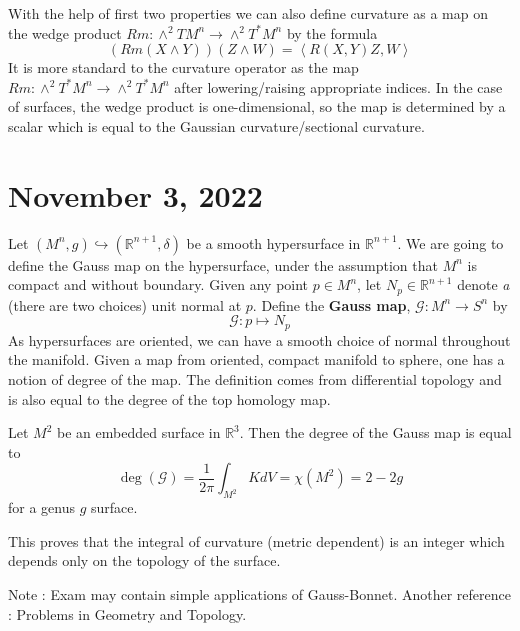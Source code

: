 \documentclass[12pt,a4paper]{article}
\theoremstyle{definition}
\theoremstyle{greenbox}
\newcommand{\R}{\mathbb{R}}
\newcommand{\Rn}{\mathbb{R}^{n+1}}
\begin{document}
    With the help of first two properties we can also define curvature as a map on the wedge product $ Rm : \wedge^{2}TM^{n} \to \wedge^{2}T^{*}M^{n}  $ by the formula 
    \[ (Rm(X \wedge Y))(Z \wedge W) = \left<  R(X,Y)Z,W\right>  \]
    It is more standard to the curvature operator as the map $ Rm : \wedge^{2}T^{*}M^{n} \to \wedge^{2}T^{*}M^{n}$ after lowering/raising appropriate indices. In the case of surfaces, the wedge product is one-dimensional, so the map is determined by a scalar which is equal to the Gaussian curvature/sectional curvature. 

    \section{November 3, 2022}

    Let $ (M^{n},g)  \hookrightarrow (\Rn, \delta)$ be a smooth hypersurface in $ \Rn $. We are going to define the Gauss map on the hypersurface, under the assumption that $ M^{n} $  is compact and without boundary. Given any point $ p \in M^{n} $, let $ N_{p} \in \Rn $ denote \textit{a} (there are two choices) unit normal at $ p $. Define the \textbf{Gauss map}, $ \mathcal{G} : M^{n} \to S^{n} $ by 
    \[ \mathcal{G} : p \mapsto N_{p}  \]
    As hypersurfaces are oriented, we can have a smooth choice of normal throughout the manifold. Given a map from oriented, compact manifold to sphere, one has a notion of degree of the map. The definition comes from differential topology and is also equal to the degree of the top homology map. 
    \newpage
    \begin{thm}
        Let $ M^2 $ be an embedded surface in $ \R^{3} $. Then the degree of the Gauss map is equal to 
        \[ \deg( \mathcal{G}) = \frac{1}{2 \pi} \int_{M^{2}}K dV  = \chi(M^{2}) = 2-2g\]
        for a genus $ g $ surface.
    \end{thm}
    \begin{remark}
        This proves that the integral of curvature (metric dependent) is an integer which depends only on the topology of the surface.
    \end{remark}
    Note : Exam may contain simple applications of Gauss-Bonnet.
    Another reference : Problems in Geometry and Topology.

    
    
\end{document}
